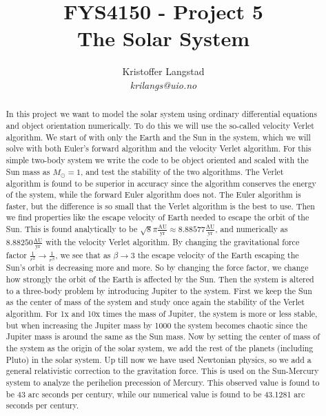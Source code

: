 \documentclass[12pt,a4paper,english]{article}
\title{FYS4150 - Project 5\\
The Solar System}
\date{}
\author{ Kristoffer Langstad\\ \textit{krilangs@uio.no}}
\begin{document}
\maketitle
\begin{abstract}
	In this project we want to model the solar system using ordinary differential equations and object orientation numerically. To do this we will use the so-called velocity Verlet algorithm. We start of with only the Earth and the Sun in the system, which we will solve with both Euler's forward algorithm and the velocity Verlet algorithm. For this simple two-body system we write the code to be object oriented and scaled with the Sun mass as $M_\odot=1$, and test the stability of the two algorithms. The Verlet algorithm is found to be superior in accuracy since the algorithm conserves the energy of the system, while the forward Euler algorithm does not. The Euler algorithm is faster, but the difference is so small that the Verlet algorithm is the best to use. Then we find properties like the escape velocity of Earth needed to escape the orbit of the Sun. This is found analytically to be $\sqrt{8}\pi\frac{\text{AU}}{\text{yr}}\approx8.88577\frac{\text{AU}}{\text{yr}}$, and numerically as $8.88250\frac{\text{AU}}{\text{yr}}$ with the velocity Verlet algorithm. By changing the gravitational force factor $\frac{1}{r^2}\rightarrow\frac{1}{r^{\beta}}$, we see that as $\beta\rightarrow3$ the escape velocity of the Earth escaping the Sun's orbit is decreasing more and more. So by changing the force factor, we change how strongly the orbit of the Earth is affected by the Sun. Then the system is altered to a three-body problem by introducing Jupiter to the system. First we keep the Sun as the center of mass of the system and study once again the stability of the Verlet algorithm. For 1x and 10x times the mass of Jupiter, the system is more or less stable, but when increasing the Jupiter mass by 1000 the system becomes chaotic since the Jupiter mass is around the same as the Sun mass. Now by setting the center of mass of the system as the origin of the solar system, we add the rest of the planets (including Pluto) in the solar system. Up till now we have used Newtonian physics, so we add a general relativistic correction to the gravitation force. This is used on the Sun-Mercury system to analyze the perihelion precession of Mercury. This observed value is found to be 43 arc seconds per century, while our numerical value is found to be 43.1281 arc seconds per century.
\end{abstract}
\end{document}

